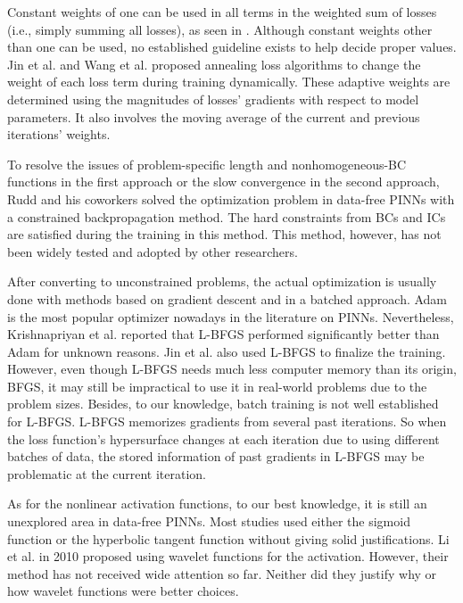 Constant weights of one can be used in all terms in the weighted sum of losses (i.e., simply summing all losses), as seen in \cite{lagaris_artificial_1998,sirignano_dgm:_2018,dockhorn_discussion_2019}.
Although constant weights other than one can be used, no established guideline exists to help decide proper values.
Jin et al. \cite{jin_nsfnets_2020} and Wang et al. \cite{wang_understanding_2021} proposed annealing loss algorithms to change the weight of each loss term during training dynamically.
These adaptive weights are determined using the magnitudes of losses' gradients with respect to model parameters.
It also involves the moving average of the current and previous iterations' weights.

To resolve the issues of problem-specific length and nonhomogeneous-BC functions in the first approach or the slow convergence in the second approach, Rudd and his coworkers \cite{rudd_constrained_2014,rudd_constrained_2015} solved the optimization problem in data-free PINNs with a constrained backpropagation method.
The hard constraints from BCs and ICs are satisfied during the training in this method.
This method, however, has not been widely tested and adopted by other researchers.

After converting to unconstrained problems, the actual optimization is usually done with methods based on gradient descent and in a batched approach. 
Adam \cite{kingma_adam_2017} is the most popular optimizer nowadays in the literature on PINNs.
Nevertheless, Krishnapriyan et al. \cite{krishnapriyan_characterizing_2021} reported that L-BFGS performed significantly better than Adam for unknown reasons.
Jin et al. \cite{jin_nsfnets_2020} also used L-BFGS to finalize the training.
However, even though L-BFGS needs much less computer memory than its origin, BFGS, it may still be impractical to use it in real-world problems due to the problem sizes.
Besides, to our knowledge, batch training is not well established for L-BFGS.
L-BFGS memorizes gradients from several past iterations.
So when the loss function's hypersurface changes at each iteration due to using different batches of data, the stored information of past gradients in L-BFGS may be problematic at the current iteration.

As for the nonlinear activation functions, to our best knowledge, it is still an unexplored area in data-free PINNs.
Most studies used either the sigmoid function or the hyperbolic tangent function without giving solid justifications.
Li et al. \cite{li_integration_2010} in 2010 proposed using wavelet functions for the activation.
However, their method has not received wide attention so far.
Neither did they justify why or how wavelet functions were better choices.
